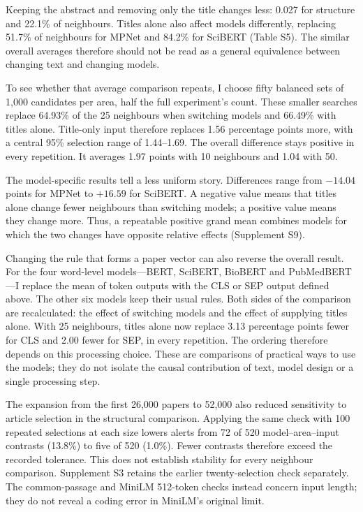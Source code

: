 \documentclass[12pt]{article}
\begin{document}
Keeping the abstract and removing only the title changes less: 0.027 for structure and 22.1\% of neighbours. Titles alone also affect models differently, replacing 51.7\% of neighbours for MPNet and 84.2\% for SciBERT (Table S5). The similar overall averages therefore should not be read as a general equivalence between changing text and changing models.

To see whether that average comparison repeats, I choose fifty balanced sets of 1,000 candidates per area, half the full experiment's count. These smaller searches replace 64.93\% of the 25 neighbours when switching models and 66.49\% with titles alone. Title-only input therefore replaces 1.56 percentage points more, with a central 95\% selection range of 1.44--1.69. The overall difference stays positive in every repetition. It averages 1.97 points with 10 neighbours and 1.04 with 50.

The model-specific results tell a less uniform story. Differences range from $-14.04$ points for MPNet to $+16.59$ for SciBERT. A negative value means that titles alone change fewer neighbours than switching models; a positive value means they change more. Thus, a repeatable positive grand mean combines models for which the two changes have opposite relative effects (Supplement S9).

Changing the rule that forms a paper vector can also reverse the overall result. For the four word-level models---BERT, SciBERT, BioBERT and PubMedBERT---I replace the mean of token outputs with the CLS or SEP output defined above. The other six models keep their usual rules. Both sides of the comparison are recalculated: the effect of switching models and the effect of supplying titles alone. With 25 neighbours, titles alone now replace 3.13 percentage points fewer for CLS and 2.00 fewer for SEP, in every repetition. The ordering therefore depends on this processing choice. These are comparisons of practical ways to use the models; they do not isolate the causal contribution of text, model design or a single processing step.

The expansion from the first 26,000 papers to 52,000 also reduced sensitivity to article selection in the structural comparison. Applying the same check with 100 repeated selections at each size lowers alerts from 72 of 520 model--area--input contrasts (13.8\%) to five of 520 (1.0\%). Fewer contrasts therefore exceed the recorded tolerance. This does not establish stability for every neighbour comparison. Supplement S3 retains the earlier twenty-selection check separately. The common-passage and MiniLM 512-token checks instead concern input length; they do not reveal a coding error in MiniLM's original limit.
\end{document}
